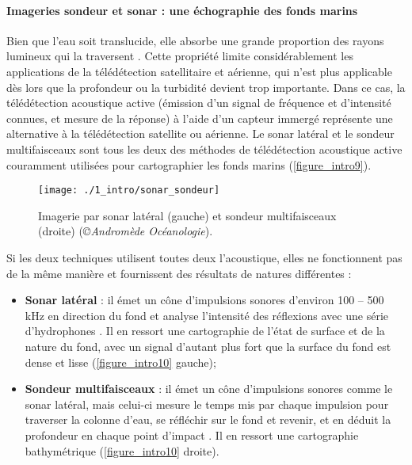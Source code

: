 \paragraph{Imageries sondeur et sonar : une échographie des fonds marins}

Bien que l’eau soit translucide, elle absorbe une grande proportion des rayons lumineux qui la traversent \citep{wozniak_light_2007}. Cette propriété limite considérablement les applications de la télédétection satellitaire et aérienne, qui n’est plus applicable dès lors que la profondeur ou la turbidité devient trop importante. Dans ce cas, la télédétection acoustique active (émission d’un signal de fréquence et d’intensité connues, et mesure de la réponse) à l’aide d’un capteur immergé représente une alternative à la télédétection satellite ou aérienne. Le sonar latéral et le sondeur multifaisceaux sont tous les deux des méthodes de télédétection acoustique active couramment utilisées pour cartographier les fonds marins \citep{saxena_review_1999, brown_benthic_2011} (\autoref{figure_intro9}). 

\begin{figure}[H]
	\begin{center}
	\texttt{[image: ./1\_intro/sonar\_sondeur]}
		\caption[Imagerie par sonar latéral et sondeur multifaisceaux]{Imagerie par sonar latéral (gauche) et sondeur multifaisceaux (droite) (\textit{©Andromède Océanologie}).}
	\label{figure_intro9}
\end{center}
\end{figure}

Si les deux techniques utilisent toutes deux l’acoustique, elles ne fonctionnent pas de la même manière et fournissent des résultats de natures différentes :

\begin{itemize}
    \item \textbf{Sonar latéral} : il émet un cône d’impulsions sonores d’environ 100 – 500 kHz en direction du fond et analyse l’intensité des réflexions avec une série d’hydrophones \citep{brown_benthic_2011}. Il en ressort une cartographie de l’état de surface et de la nature du fond, avec un signal d’autant plus fort que la surface du fond est dense et lisse (\autoref{figure_intro10} gauche);
    
    \item \textbf{Sondeur multifaisceaux} : il émet un cône d’impulsions sonores comme le sonar latéral, mais celui-ci mesure le temps mis par chaque impulsion pour traverser la colonne d’eau, se réfléchir sur le fond et revenir, et en déduit la profondeur en chaque point d’impact \citep{brown_benthic_2011}. Il en ressort une cartographie bathymétrique (\autoref{figure_intro10} droite).
    
\end{itemize}


